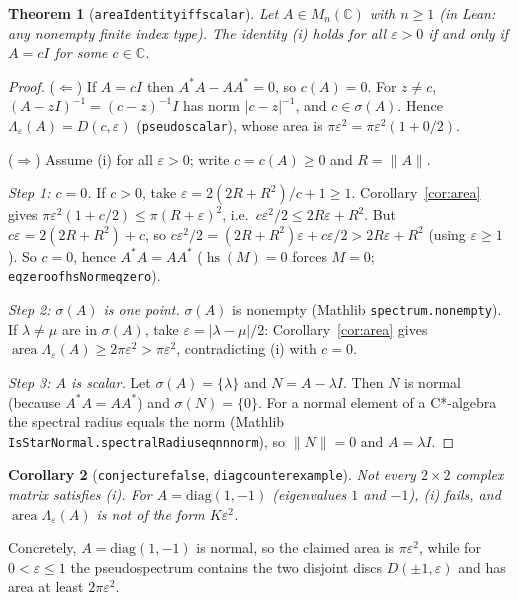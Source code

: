 \documentclass[11pt]{article}
\newtheorem{theorem}{Theorem}
\newtheorem{corollary}[theorem]{Corollary}
\theoremstyle{definition}
\theoremstyle{remark}
\renewcommand{\_}{\oldus\allowbreak}
\newcommand{\C}{\mathbb{C}}
\newcommand{\area}{\operatorname{area}}
\newcommand{\hs}{\operatorname{hs}}
\begin{document}
\begin{theorem}[\texttt{areaIdentity\_iff\_scalar}]\label{thm:iff}
Let $A\in M_n(\C)$ with $n\ge1$ (in Lean: any nonempty finite index type). The identity (i) holds for all
$\varepsilon>0$ if and only if $A=cI$ for some $c\in\C$.
\end{theorem}
\begin{proof}
($\Leftarrow$) If $A=cI$ then $A^*A-AA^*=0$, so $c(A)=0$. For $z\ne c$, $(A-zI)^{-1}=(c-z)^{-1}I$ has norm
$|c-z|^{-1}$, and $c\in\sigma(A)$. Hence $\Lambda_\varepsilon(A) = D(c,\varepsilon)$ (\texttt{pseudo\_scalar}),
whose area is $\pi\varepsilon^2 = \pi\varepsilon^2(1+0/2)$.

($\Rightarrow$) Assume (i) for all $\varepsilon>0$; write $c=c(A)\ge0$ and $R=\|A\|$.

\emph{Step 1: $c=0$.} If $c>0$, take $\varepsilon = 2(2R+R^2)/c+1\ge1$. Corollary~\ref{cor:area} gives
$\pi\varepsilon^2(1+c/2)\le\pi(R+\varepsilon)^2$, i.e.\ $c\varepsilon^2/2\le 2R\varepsilon+R^2$. But
$c\varepsilon = 2(2R+R^2)+c$, so $c\varepsilon^2/2 = (2R+R^2)\varepsilon + c\varepsilon/2 > 2R\varepsilon+R^2$
(using $\varepsilon\ge1$). So $c=0$, hence $A^*A=AA^*$ ($\hs(M)=0$ forces $M=0$; \texttt{eq\_zero\_of\_hsNorm\_eq\_zero}).

\emph{Step 2: $\sigma(A)$ is one point.} $\sigma(A)$ is nonempty (Mathlib \texttt{spectrum.nonempty}). If
$\lambda\ne\mu$ are in $\sigma(A)$, take $\varepsilon=|\lambda-\mu|/2$: Corollary~\ref{cor:area} gives
$\area\Lambda_\varepsilon(A)\ge2\pi\varepsilon^2>\pi\varepsilon^2$, contradicting (i) with $c=0$.

\emph{Step 3: $A$ is scalar.} Let $\sigma(A)=\{\lambda\}$ and $N=A-\lambda I$. Then $N$ is normal (because
$A^*A=AA^*$) and $\sigma(N)=\{0\}$. For a normal element of a C*-algebra the spectral radius equals the norm
(Mathlib \texttt{IsStarNormal.spectralRadius\_eq\_nnnorm}), so $\|N\|=0$ and $A=\lambda I$.
\end{proof}

\begin{corollary}[\texttt{conjecture\_2341\_false}, \texttt{diag\_counterexample}]
Not every $2\times2$ complex matrix satisfies (i). For $A=\mathrm{diag}(1,-1)$ (eigenvalues $1$ and $-1$),
(i) fails, and $\area\Lambda_\varepsilon(A)$ is not of the form $K\varepsilon^2$.
\end{corollary}
Concretely, $A=\mathrm{diag}(1,-1)$ is normal, so the claimed area is $\pi\varepsilon^2$, while for
$0<\varepsilon\le1$ the pseudospectrum contains the two disjoint discs $D(\pm1,\varepsilon)$ and has area at least
$2\pi\varepsilon^2$.
\end{document}
